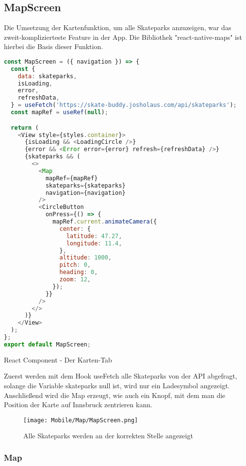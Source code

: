 \subsection{MapScreen}
Die Umsetzung der Kartenfunktion, um alle Skateparks anzuzeigen, war das zweit-komplizierteste
Feature in der App. Die Bibliothek "react-native-maps" ist hierbei die Basis dieser Funktion.

\begin{code}[htp]
\begin{lstlisting}[firstnumber=1,language=JavaScript, style=JSX]
const MapScreen = ({ navigation }) => {
  const {
    data: skateparks,
    isLoading,
    error,
    refreshData,
  } = useFetch('https://skate-buddy.josholaus.com/api/skateparks');
  const mapRef = useRef(null);

  return (
    <View style={styles.container}>
      {isLoading && <LoadingCircle />}
      {error && <Error error={error} refresh={refreshData} />}
      {skateparks && (
        <>
          <Map
            mapRef={mapRef}
            skateparks={skateparks}
            navigation={navigation}
          />
          <CircleButton
            onPress={() => {
              mapRef.current.animateCamera({
                center: {
                  latitude: 47.27,
                  longitude: 11.4,
                },
                altitude: 1000,
                pitch: 0,
                heading: 0,
                zoom: 12,
              });
            }}
          />
        </>
      )}
    </View>
  );
};
export default MapScreen;
\end{lstlisting}
\caption{React Component - Der Karten-Tab}
\end{code}

Zuerst werden mit dem Hook useFetch alle Skateparks von der API abgefragt, solange die Variable
skateparks null ist, wird nur ein Ladesymbol angezeigt. Anschließend wird die Map erzeugt, wie auch
ein Knopf, mit dem man die Position der Karte auf Innsbruck zentrieren kann.

\begin{figure}[H]
  \begin{center}
    \texttt{[image: Mobile/Map/MapScreen.png]}
    \caption{Alle Skateparks werden an der korrekten Stelle angezeigt}
  \end{center}
\end{figure}

\newpage
\subsubsection{Map}

